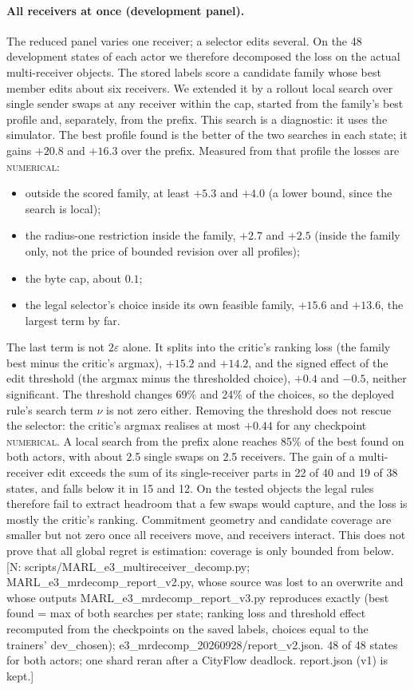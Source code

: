 \documentclass[11pt]{article}
\theoremstyle{definition}
\newcommand{\NUM}{\textsc{numerical}}
\newif\ifshownotes\shownotestrue
\newcommand{\NOTE}[1]{\ifshownotes{\color{notecol}\,\textsf{\footnotesize[N: #1]}}\fi}
\begin{document}
\paragraph{All receivers at once (development panel).} The reduced panel varies one receiver; a
selector edits several. On the 48 development states of each actor we therefore decomposed the loss
on the actual multi-receiver objects. The stored labels score a candidate family whose best member
edits about six receivers. We extended it by a rollout local search over single sender swaps at any
receiver within the cap, started from the family's best profile and, separately, from the prefix.
This search is a diagnostic: it uses the simulator. The best profile found is the better of the two
searches in each state; it gains $+20.8$ and $+16.3$ over the prefix. Measured from that profile the
losses are \NUM:
\begin{itemize}
\item outside the scored family, at least $+5.3$ and $+4.0$ (a lower bound, since the search is local);
\item the radius-one restriction inside the family, $+2.7$ and $+2.5$ (inside the family only, not the
  price of bounded revision over all profiles);
\item the byte cap, about $0.1$;
\item the legal selector's choice inside its own feasible family, $+15.6$ and $+13.6$, the largest term
  by far.
\end{itemize}
The last term is not $2\varepsilon$ alone. It splits into the critic's ranking loss (the family best
minus the critic's argmax), $+15.2$ and $+14.2$, and the signed effect of the edit threshold (the argmax
minus the thresholded choice), $+0.4$ and $-0.5$, neither significant. The threshold changes 69\% and
24\% of the choices, so the deployed rule's search term $\nu$ is not zero either. Removing the threshold
does not rescue the selector: the critic's argmax realises at most $+0.44$ for any checkpoint \NUM.
A local search from the prefix alone reaches 85\% of the best found on both actors, with about 2.5 single
swaps on 2.5 receivers. The gain of a multi-receiver edit exceeds the sum of its single-receiver parts in
22 of 40 and 19 of 38 states, and falls below it in 15 and 12. On the tested objects the legal rules
therefore fail to extract headroom that a few swaps would capture, and the loss is mostly the critic's
ranking. Commitment geometry and candidate coverage are smaller but not zero once all receivers move,
and receivers interact. This does not prove that all global regret is estimation: coverage is only
bounded from below.
\NOTE{scripts/MARL\_e3\_multireceiver\_decomp.py; MARL\_e3\_mrdecomp\_report\_v2.py, whose source was lost to an overwrite and
whose outputs MARL\_e3\_mrdecomp\_report\_v3.py reproduces exactly (best found = max of both
searches per state; ranking loss and threshold effect recomputed from the checkpoints on the saved labels, choices
equal to the trainers' dev\_chosen); e3\_mrdecomp\_20260928/report\_v2.json. 48 of 48 states for both actors; one
shard reran after a CityFlow deadlock. report.json (v1) is kept.}
\end{document}
